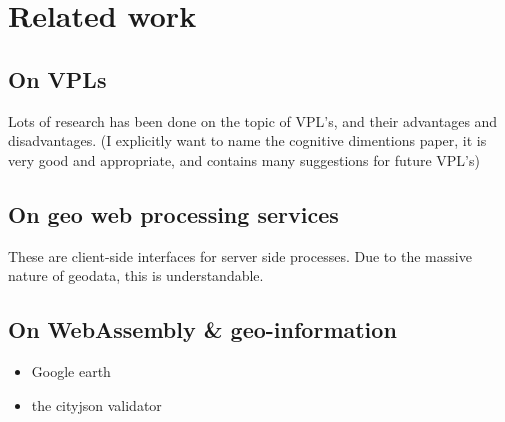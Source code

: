 \newpage
\section{Related work}

\subsection{On VPLs}
Lots of research has been done on the topic of VPL's, and their advantages and disadvantages. 
(I explicitly want to name the cognitive dimentions paper, it is very good and appropriate, and contains many suggestions for future VPL's)


\subsection{On geo web processing services}
These are client-side interfaces for server side processes. 
Due to the massive nature of geodata, this is understandable.


\subsection{On WebAssembly \& geo-information}

\begin{itemize}
  \item Google earth
  \item the cityjson validator
\end{itemize}